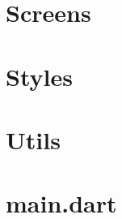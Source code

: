 \section{Screens}
\label{sec:screens}

\section{Styles}
\label{sec:styles}


\section{Utils}
\label{sec:utils}

\section{main.dart}
\label{sec:main}



